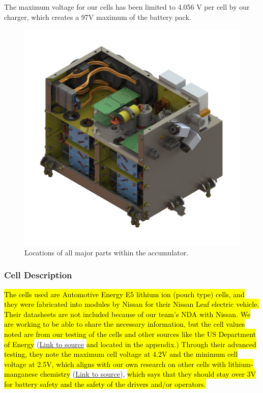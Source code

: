 \documentclass{article}
\DeclareRobustCommand{\hlr}[1]{{\sethlcolor{red}\hl{#1}}}
\begin{document}
            The maximum voltage for our cells has been limited to 4.056 V per cell by our charger, which creates a 97V maximum of the battery pack.

            \begin{figure}[H]
                \centering
                \includegraphics[width = 0.7 \textwidth]{accumulator_internal_isoview}
                \caption{Locations of all major parts within the accumulator. }
                \label{accumlocations}
            \end{figure}

        \subsubsection{Cell Description} \label{celldescription}

        \hlr{The cells used are Automotive Energy E5 lithium ion (pouch type) cells, and they were fabricated into modules by Nissan for their Nissan Leaf electric vehicle. Their datasheets are not included because of our team's NDA with Nissan. We are working to be able to share the necessary information, but the cell values noted are from our testing of the cells and other sources like the US Department of Energy} (\href{http://energy.gov/sites/prod/files/2014/02/f8/battery_leaf_0356.pdf}{Link to source} \hlr{and located in the appendix.) Through their advanced testing, they note the maximum cell voltage at 4.2V and the minimum cell voltage at 2.5V, which aligns with our own research on other cells with lithium-manganese chemistry} (\href{http://batteryuniversity.com/learn/article/discharge_methods}{Link to source}), \hlr{which says that they should stay over 3V for battery safety and the safety of the drivers and/or operators.}
\end{document}
